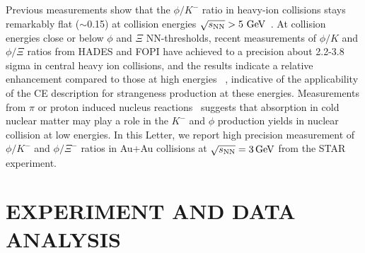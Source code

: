 \documentclass[aps,tightenlines,superscriptaddress,twocolumn]{revtex4-1}
\begin{document}
Previous measurements 
show that the $\phi/K^-$ ratio in heavy-ion collisions stays remarkably flat ($\sim$0.15) at collision energies ${\sqrt{s_{\rm NN}} > \textup{5 GeV}}$~\cite{E917_phi:2004,NA49_phi:2008,star_bes_strangeness:2020}. 
At collision energies close or below $\phi$ and $\Xi$ NN-thresholds, recent measurements of $\phi/K$ and $\phi/\Xi$ ratios from HADES and FOPI have achieved to a precision about 2.2-3.8 sigma in central heavy ion collisions, and the results indicate a relative enhancement compared to those at high energies
~\cite{HADES_phi_ArKCl:2009,FOPI_phi_NiNi:2015,FOPI_phi_AlAl:2016,HADES_phi_AuAu:2018}, indicative of the applicability of the CE description for strangeness production at these energies. 
Measurements from $\pi$ or proton induced nucleus reactions~\cite{HADES_PRL_pA:2007,HADES_PRL_W_C:2019}
suggests that absorption in cold nuclear matter may play a role in the $K^-$ and $\phi$ production yields in nuclear collision at low energies. 
In this Letter, we report high precision measurement of $\phi/K^-$ and $\phi/\Xi^-$ ratios in Au+Au collisions at ${\sqrt{s_{\rm NN}} = \rm{3\,GeV}}$ from the STAR experiment.

\section{EXPERIMENT AND DATA ANALYSIS }
\label{dataanalysis}
\end{document}
